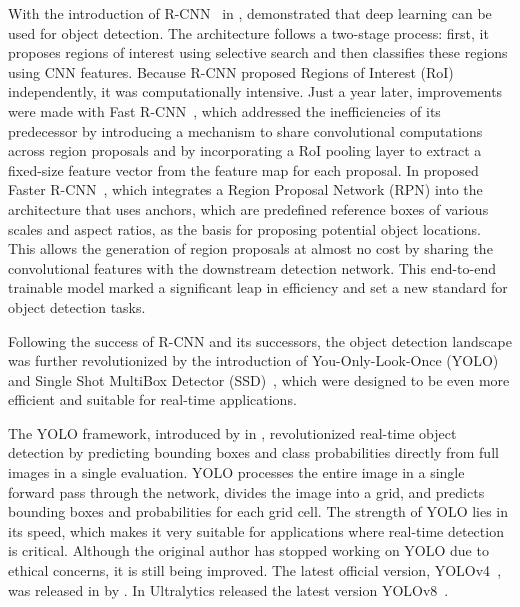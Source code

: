 With the introduction of R-CNN~\cite{Girshick14} in \citeyear{Girshick14}, \citeauthor{Girshick14} demonstrated that deep learning can be used for object detection. The architecture follows a two-stage process: first, it proposes regions of interest using selective search and then classifies these regions using CNN features. Because R-CNN proposed Regions of Interest (RoI) independently, it was computationally intensive. Just a year later, improvements were made with Fast R-CNN~\cite{Girshick15}, which addressed the inefficiencies of its predecessor by introducing a mechanism to share convolutional computations across region proposals and by incorporating a RoI pooling layer to extract a fixed-size feature vector from the feature map for each proposal. In \citeyear{Ren17} \citeauthor{Ren17} proposed Faster R-CNN~\cite{Ren17}, which integrates a Region Proposal Network (RPN) into the architecture that uses anchors, which are predefined reference boxes of various scales and aspect ratios, as the basis for proposing potential object locations. This allows the generation of region proposals at almost no cost by sharing the convolutional features with the downstream detection network. This end-to-end trainable model marked a significant leap in efficiency and set a new standard for object detection tasks.

Following the success of R-CNN and its successors, the object detection landscape was further revolutionized by the introduction of You-Only-Look-Once (YOLO)~\cite{Redmon15} and Single Shot MultiBox Detector (SSD)~\cite{Liu15}, which were designed to be even more efficient and suitable for real-time applications.

The YOLO framework, introduced by \citeauthor{Redmon15} in \citeyear{Redmon15}, revolutionized real-time object detection by predicting bounding boxes and class probabilities directly from full images in a single evaluation. YOLO processes the entire image in a single forward pass through the network, divides the image into a grid, and predicts bounding boxes and probabilities for each grid cell. The strength of YOLO lies in its speed, which makes it very suitable for applications where real-time detection is critical. Although the original author has stopped working on YOLO due to ethical concerns, it is still being improved. The latest official version, YOLOv4~\cite{Bochkovskiy20}, was released in \citeyear{Bochkovskiy20} by \citeauthor{Bochkovskiy20}. In \citeyear{Jocher23a} Ultralytics released the latest version YOLOv8~\cite{Jocher23a, Jocher23b}.

